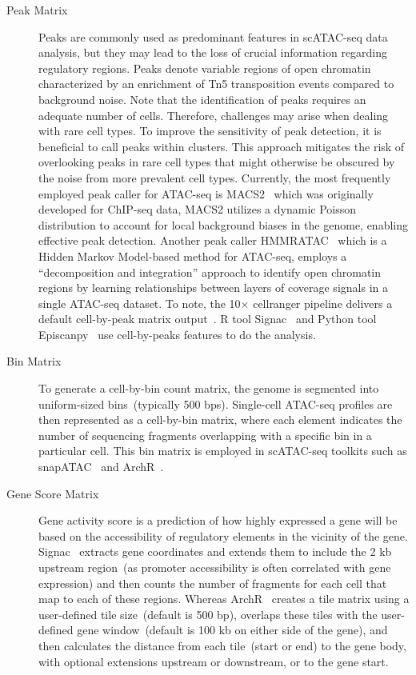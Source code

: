 \begin{description}
	\item[Peak Matrix]
	Peaks are commonly used as predominant features in scATAC-seq data analysis, but they may lead to the loss of crucial information regarding regulatory regions. Peaks denote variable regions of open chromatin characterized by an enrichment of Tn5 transposition events compared to background noise. Note that the identification of peaks requires an adequate number of cells. Therefore, challenges may arise when dealing with rare cell types. To improve the sensitivity of peak detection, it is beneficial to call peaks within clusters. This approach mitigates the risk of overlooking peaks in rare cell types that might otherwise be obscured by the noise from more prevalent cell types. Currently, the most frequently employed peak caller for ATAC-seq is MACS2~\citep{zhang2008macs2} which was originally developed for ChIP-seq data, MACS2 utilizes a dynamic Poisson distribution to account for local background biases in the genome, enabling effective peak detection. Another peak caller HMMRATAC~\citep{tarbell2019hmmratac} which is a Hidden Markov Model-based method for ATAC-seq, employs a ``decomposition and integration'' approach to identify open chromatin regions by learning relationships between layers of coverage signals in a single ATAC-seq dataset. To note, the 10$\times$ cellranger pipeline delivers a default cell-by-peak matrix output~\citep{satpathy2019massively}. R tool Signac~\citep{signac} and Python tool Episcanpy~\citep{Danese2021episcanpy} use cell-by-peaks features to do the analysis.

	\item[Bin Matrix]
	To generate a cell-by-bin count matrix, the genome is segmented into uniform-sized bins~(typically 500 bps). Single-cell ATAC-seq profiles are then represented as a cell-by-bin matrix, where each element indicates the number of sequencing fragments overlapping with a specific bin in a particular cell. This bin matrix is employed in scATAC-seq toolkits such as snapATAC~\citep{fang2021snapatac} and ArchR~\citep{Granja2021}.

	\item[Gene Score Matrix]
	Gene activity score is a prediction of how highly expressed a gene will be based on the accessibility of regulatory elements in the vicinity of the gene. Signac~\citep{signac} extracts gene coordinates and extends them to include the 2 kb upstream region~(as promoter accessibility is often correlated with gene expression) and then counts the number of fragments for each cell that map to each of these regions. Whereas ArchR~\citep{granja2019single} creates a tile matrix using a user-defined tile size~(default is 500 bp), overlaps these tiles with the user-defined gene window~(default is 100 kb on either side of the gene), and then calculates the distance from each tile~(start or end) to the gene body, with optional extensions upstream or downstream, or to the gene start.
\end{description}

